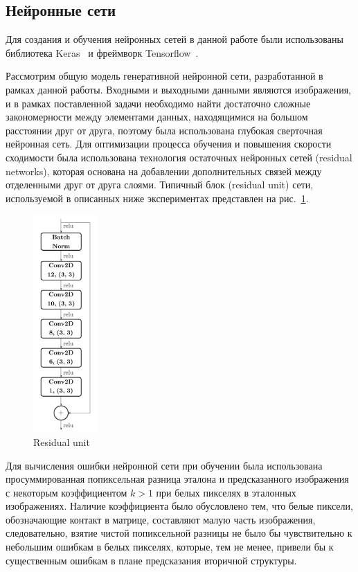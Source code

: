\documentclass[14pt]{matmex-diploma-custom}
\begin{document}
\subsection{Нейронные сети}
Для создания и обучения нейронных сетей в данной работе были использованы библиотека Keras~\cite{chollet2015keras} и фреймворк Tensorflow~\cite{tensorflow2015-whitepaper}.

Рассмотрим общую модель генеративной нейронной сети, разработанной в рамках данной работы. Входными и выходными данными являются изображения, и в рамках поставленной задачи необходимо найти достаточно сложные закономерности между элементами данных, находящимися на большом расстоянии друг от друга, поэтому была использована глубокая сверточная нейронная сеть. Для оптимизации процесса обучения и повышения скорости сходимости была использована технология остаточных нейронных сетей (residual networks), которая основана на добавлении дополнительных связей между отделенными друг от друга слоями. Типичный блок (residual unit) сети, используемой в описанных ниже экспериментах представлен на рис.~\ref{unit}.

\begin{figure}[h]
\begin{center}
\centering
\includegraphics[width=2.5cm]{pics/res_unit.pdf}
\caption{Residual unit}
\label{unit}
\end{center}
\end{figure} 

Для вычисления ошибки нейронной сети при обучении была использована просуммированная попиксельная разница эталона и предсказанного изображения с некоторым коэффициентом $k > 1$ при белых пикселях в эталонных изображениях. Наличие коэффициента было обусловлено тем, что белые пиксели, обозначающие контакт в матрице, составляют малую часть изображения, следовательно, взятие чистой попиксельной разницы не было бы чувствительно к небольшим ошибкам в белых пикселях, которые, тем не менее, привели бы к существенным ошибкам в плане предсказания вторичной структуры. 
\end{document}
